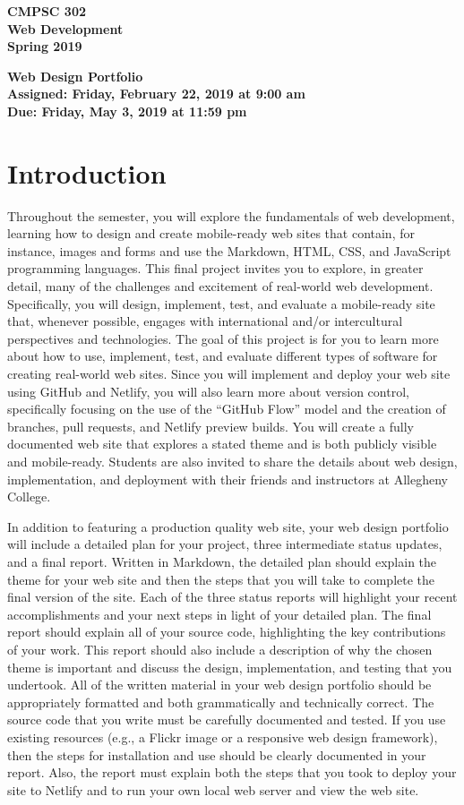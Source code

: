 \documentclass[11pt]{article}
\newcommand{\assignmentduedate}{May 3}
\newcommand{\assignmentassignedate}{February 22}
\newcommand{\labyear}{2019}
\newcommand{\labday}{Friday}
\newcommand{\labdueday}{Friday}
\newcommand{\labtime}{9:00 am}
\newcommand{\labduetime}{11:59 pm}
\newcommand{\assigneddate}{Assigned: \labday, \assignmentassignedate, \labyear{} at \labtime{}}
\newcommand{\duedate}{Due: \labdueday, \assignmentduedate, \labyear{} at \labduetime{}}
\newcommand{\labtitle}[1]
{
  \begin{center}
    \begin{center}
      \bf
      CMPSC 302\\Web Development\\
      Spring 2019\\
      \medskip
    \end{center}
    \bf
    #1
  \end{center}
}
\begin{document}
\thispagestyle{empty}

\labtitle{Web Design Portfolio \\ \assigneddate{} \\ \duedate{}}

\section*{Introduction}

Throughout the semester, you will explore the fundamentals of web development,
learning how to design and create mobile-ready web sites that contain, for
instance, images and forms and use the Markdown, HTML, CSS, and JavaScript
programming languages. This final project invites you to explore, in greater
detail, many of the  challenges and excitement of real-world web development.
%
Specifically, you will design, implement, test, and evaluate a mobile-ready site
that, whenever possible, engages with international and/or intercultural
perspectives and technologies. The goal of this project is for you to learn more
about how to use, implement, test, and evaluate different types of software for
creating real-world web sites.
%
Since you will implement and deploy your web site using GitHub and Netlify, you
will also learn more about version control, specifically focusing on the use of
the ``GitHub Flow'' model and the creation of branches, pull requests, and
Netlify preview builds.
%
You will create a fully documented web site that explores a stated theme and is
both publicly visible and mobile-ready.
%
Students are also invited to share the details about web design, implementation,
and deployment with their friends and instructors at Allegheny College.

In addition to featuring a production quality web site, your web design
portfolio will include a detailed plan for your project, three intermediate
status updates, and a final report.
%
Written in Markdown, the detailed plan should explain the theme for your web
site and then the steps that you will take to complete the final version of the
site.
%
Each of the three status reports will highlight your recent accomplishments and
your next steps in light of your detailed plan.
%
The final report should explain all of your source code, highlighting the key
contributions of your work. This report should also include a description of why
the chosen theme is important and discuss the design, implementation, and
testing that you undertook.
%
All of the written material in your web design portfolio should be appropriately
formatted and both grammatically and technically correct. The source code that
you write must be carefully documented and tested. If you use existing resources
(e.g., a Flickr image or a responsive web design framework), then the steps for
installation and use should be clearly documented in your report. Also, the
report must explain both the steps that you took to deploy your site to Netlify
and to run your own local web server and view the web site.
\end{document}
